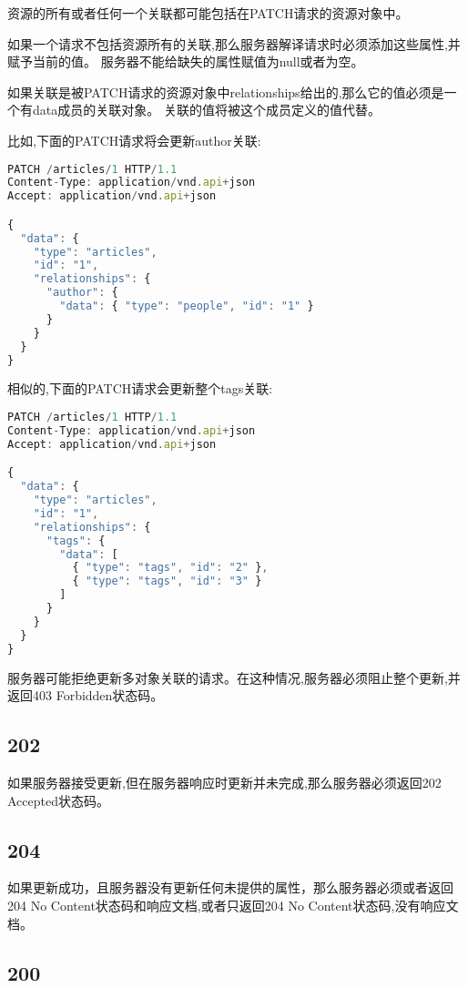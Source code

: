 资源的所有或者任何一个关联都可能包括在PATCH请求的资源对象中。

如果一个请求不包括资源所有的关联,那么服务器解译请求时必须添加这些属性,并赋予当前的值。 服务器不能给缺失的属性赋值为null或者为空。

如果关联是被PATCH请求的资源对象中relationships给出的,那么它的值必须是一个有data成员的关联对象。 关联的值将被这个成员定义的值代替。

比如,下面的PATCH请求将会更新author关联:

\begin{lstlisting}[language=JavaScript]
PATCH /articles/1 HTTP/1.1
Content-Type: application/vnd.api+json
Accept: application/vnd.api+json

{
  "data": {
    "type": "articles",
    "id": "1",
    "relationships": {
      "author": {
        "data": { "type": "people", "id": "1" }
      }
    }
  }
}
\end{lstlisting}


相似的,下面的PATCH请求会更新整个tags关联:


\begin{lstlisting}[language=JavaScript]
PATCH /articles/1 HTTP/1.1
Content-Type: application/vnd.api+json
Accept: application/vnd.api+json

{
  "data": {
    "type": "articles",
    "id": "1",
    "relationships": {
      "tags": {
        "data": [
          { "type": "tags", "id": "2" },
          { "type": "tags", "id": "3" }
        ]
      }
    }
  }
}
\end{lstlisting}

服务器可能拒绝更新多对象关联的请求。在这种情况,服务器必须阻止整个更新,并返回403 Forbidden状态码。


\subsection{202}

如果服务器接受更新,但在服务器响应时更新并未完成,那么服务器必须返回202 Accepted状态码。

\subsection{204}

如果更新成功，且服务器没有更新任何未提供的属性，那么服务器必须或者返回204 No Content状态码和响应文档,或者只返回204 No Content状态码,没有响应文档。

\subsection{200}


